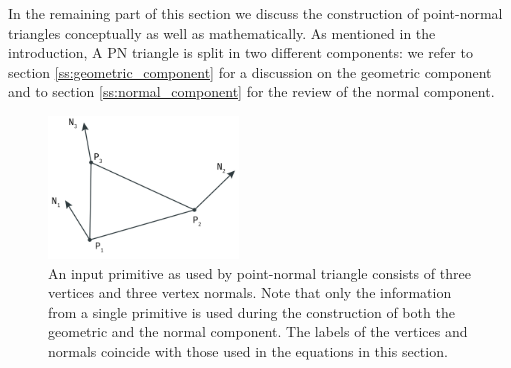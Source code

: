 In the remaining part of this section we discuss the construction of point-normal triangles conceptually as well as mathematically. As mentioned in the introduction, A PN triangle is split in two different components: we refer to section \ref{ss:geometric_component} for a discussion on the geometric component and to section \ref{ss:normal_component} for the review of the normal component.

\begin{figure}
	\centering
	\includegraphics[width=0.45\textwidth]{./content/img/method/input.png}
	\caption{An input primitive as used by point-normal triangle consists of three vertices and three vertex normals. Note that only the information from a single primitive is used during the construction of both the geometric and the normal component. The labels of the vertices and normals coincide with those used in the equations in this section.}
	\label{fig:method:input_primitive}
\end{figure}




